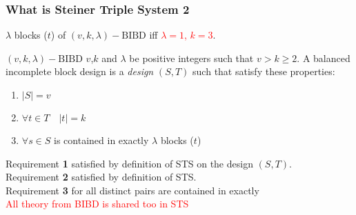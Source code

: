 	\begin{frame}
	\frametitle{What is Steiner Triple System 2}
	
	$\lambda$ blocks ($t$) of $(v,k,\lambda)-\mathrm{BIBD}$ iff \textcolor{red}{$\lambda = 1$, $k=3$}.
	
	\begin{block}{$(v,k,\lambda)-\mathrm{BIBD}$}
		$v$,$k$ and $\lambda$ be positive integers such that $v > k \ge 2$. A balanced incomplete block design is a \textit{design} $(S,T)$ such that satisfy these properties:
		\begin{enumerate}
			\item $|S|=v$
			\item $\forall t \in T\quad |t|= k $
			\item $\forall s \in S$ is contained in exactly $\lambda$ blocks ($t$) 
		\end{enumerate}
	\end{block}

	Requirement \textbf{1} satisfied by definition of STS on the design $(S,T)$.\\
	Requirement \textbf{2} satisfied by definition of STS.\\	 
	Requirement \textbf{3} for all distinct pairs are contained in exactly \\
	\pause
	\textcolor{red}{All theory from BIBD is shared too in STS}
	
	\end{frame}
